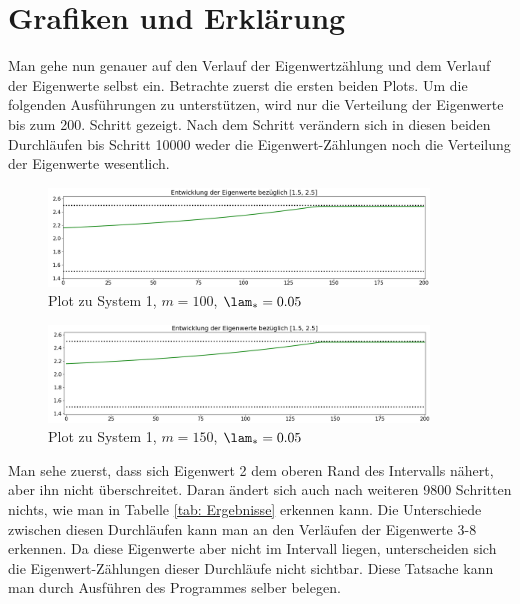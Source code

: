 \documentclass[a4paper,12pt]{report}
\newcommand{\1}{\mathds{1}}
\theoremstyle{plain} %
\theoremstyle{definition} %
\theoremstyle{remark}
\begin{document}
      \section{Grafiken und Erklärung}
            Man gehe nun genauer auf den Verlauf der Eigenwertzählung und dem Verlauf der Eigenwerte selbst ein.
            Betrachte zuerst die ersten beiden Plots.
            Um die folgenden Ausführungen zu unterstützen, wird nur die Verteilung der Eigenwerte bis zum 200. Schritt gezeigt.
            Nach dem Schritt verändern sich in diesen beiden Durchläufen bis Schritt 10000 weder die Eigenwert-Zählungen noch die Verteilung der Eigenwerte wesentlich.
            \begin{figure}[ht]
                  \centering
                  \includegraphics[width=0.9\textwidth, keepaspectratio]{./Original/Plot_1_100_0.05.png}
                  \caption{Plot zu System 1, $m=100$, $\lam_*=0.05$}
                  \label{fig: Plot_1_100_0.05}
            \end{figure}

            \begin{figure}[ht]
                  \centering
                  \includegraphics[width=0.9\textwidth, keepaspectratio]{./Original/Plot_1_150_0.05.png}
                  \caption{Plot zu System 1, $m=150$, $\lam_*=0.05$}
                  \label{fig: Plot_1_150_0.05}
            \end{figure}

            Man sehe zuerst, dass sich Eigenwert 2 dem oberen Rand des Intervalls nähert, aber ihn nicht überschreitet.
            Daran ändert sich auch nach weiteren 9800 Schritten nichts, wie man in Tabelle \ref{tab: Ergebnisse} erkennen kann.
            Die Unterschiede zwischen diesen Durchläufen kann man an den Verläufen der Eigenwerte 3-8 erkennen.
            Da diese Eigenwerte aber nicht im Intervall liegen, unterscheiden sich die Eigenwert-Zählungen dieser Durchläufe nicht sichtbar.
            Diese Tatsache kann man durch Ausführen des Programmes selber belegen.
\end{document}
